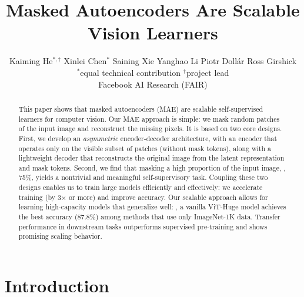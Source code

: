 \documentclass[10pt,twocolumn,letterpaper]{article}
\newcommand{\x}{{\times}}
\newcommand{\authorskip}{\hspace{2.5mm}}
\begin{document}
\title{
\vspace{-1mm}\Large Masked Autoencoders Are Scalable Vision Learners\vspace{-3mm}}
\author{
 Kaiming He$^{*,\dagger}$ \authorskip Xinlei Chen$^{*}$ \authorskip Saining Xie \authorskip
 Yanghao Li \authorskip Piotr Doll\'ar \authorskip Ross Girshick \\[2mm]
 \small $^{*}$equal technical contribution \qquad $^{\dagger}$project lead \\[2mm]
 Facebook AI Research (FAIR)\vspace{-4mm}
}
\maketitle

\begin{abstract}
This paper shows that masked autoencoders (MAE) are scalable self-supervised learners for computer vision. Our MAE approach is simple: we mask random patches of the input image and reconstruct the missing pixels. It is based on two core designs. First, we develop an \mbox{\emph{asymmetric}} encoder-decoder architecture, with an encoder that operates only on the visible subset of patches (without mask tokens), along with a lightweight decoder that reconstructs the original image from the latent representation and mask tokens. Second, we find that masking a high proportion of the input image, \eg, 75\%, yields a nontrivial and meaningful self-supervisory task. Coupling these two designs enables us to train large models efficiently and effectively: we accelerate training (by 3$\x$ or more) and improve accuracy. Our scalable approach allows for learning high-capacity models that generalize well: \eg, a vanilla \mbox{ViT-Huge} model achieves the best accuracy (87.8\%) among methods that use only ImageNet-1K data. Transfer performance in downstream tasks outperforms supervised pre-training and shows promising scaling behavior.
\end{abstract}

\section{Introduction}
\label{sec:intro}
\end{document}
